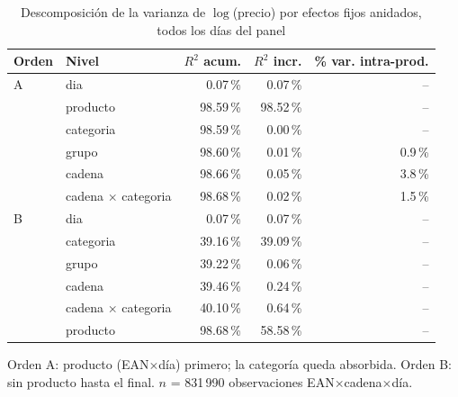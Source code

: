 \begin{table}[htbp]
\caption{Descomposici\'on de la varianza de $\log$(precio) por efectos fijos anidados, todos los d\'ias del panel}
\label{tab:varianza}
\centering\scriptsize\setlength{\tabcolsep}{3pt}
\begin{tabular}{@{}llrrr@{}}
\toprule
Orden & Nivel & $R^2$ acum. & $R^2$ incr. & \% var. intra-prod. \\
\midrule
A & dia & 0.07\,\% & 0.07\,\% & -- \\
 & producto & 98.59\,\% & 98.52\,\% & -- \\
 & categoria & 98.59\,\% & 0.00\,\% & -- \\
 & grupo & 98.60\,\% & 0.01\,\% & 0.9\,\% \\
 & cadena & 98.66\,\% & 0.05\,\% & 3.8\,\% \\
 & cadena $\times$ categoria & 98.68\,\% & 0.02\,\% & 1.5\,\% \\
\midrule
B & dia & 0.07\,\% & 0.07\,\% & -- \\
 & categoria & 39.16\,\% & 39.09\,\% & -- \\
 & grupo & 39.22\,\% & 0.06\,\% & -- \\
 & cadena & 39.46\,\% & 0.24\,\% & -- \\
 & cadena $\times$ categoria & 40.10\,\% & 0.64\,\% & -- \\
 & producto & 98.68\,\% & 58.58\,\% & -- \\
\bottomrule\end{tabular}
\par\smallskip\raggedright\scriptsize Orden A: producto (EAN$\times$d\'ia) primero; la categor\'ia queda absorbida. Orden B: sin producto hasta el final. $n$ = 831\,990 observaciones EAN$\times$cadena$\times$d\'ia.
\end{table}
